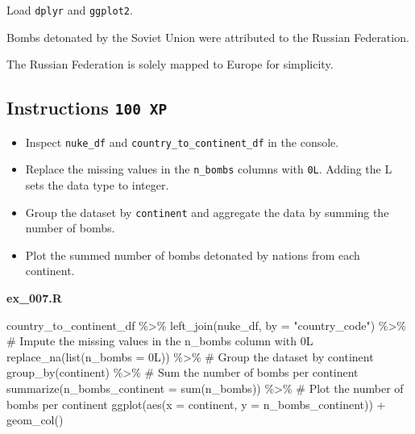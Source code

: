 \documentclass[
  letterpaper,
  DIV=11,
  numbers=noendperiod]{scrreprt}
\newenvironment{Shaded}{\begin{snugshade}}{\end{snugshade}}
\newcommand{\AttributeTok}[1]{\textcolor[rgb]{0.40,0.45,0.13}{#1}}
\newcommand{\CommentTok}[1]{\textcolor[rgb]{0.37,0.37,0.37}{#1}}
\newcommand{\FunctionTok}[1]{\textcolor[rgb]{0.28,0.35,0.67}{#1}}
\newcommand{\NormalTok}[1]{\textcolor[rgb]{0.00,0.23,0.31}{#1}}
\newcommand{\SpecialCharTok}[1]{\textcolor[rgb]{0.37,0.37,0.37}{#1}}
\newcommand{\StringTok}[1]{\textcolor[rgb]{0.13,0.47,0.30}{#1}}
\providecommand{\tightlist}{%
  \setlength{\itemsep}{0pt}\setlength{\parskip}{0pt}}\usepackage{longtable,booktabs,array}
\begin{document}
Load \texttt{dplyr} and \texttt{ggplot2}.

\begin{description}
\tightlist
\item[Side note 1:]
Bombs detonated by the Soviet Union were attributed to the Russian
Federation.
\item[Side note 2:]
The Russian Federation is solely mapped to Europe for simplicity.
\end{description}

\hypertarget{instructions-100-xp-6}{%
\subsection*{\texorpdfstring{Instructions
\texttt{100\ XP}}{Instructions 100 XP}}\label{instructions-100-xp-6}}

\begin{itemize}
\tightlist
\item
  Inspect \texttt{nuke\_df} and \texttt{country\_to\_continent\_df} in
  the console.
\item
  Replace the missing values in the \texttt{n\_bombs} columns with
  \texttt{0L}. Adding the L sets the data type to integer.
\item
  Group the dataset by \texttt{continent} and aggregate the data by
  summing the number of bombs.
\item
  Plot the summed number of bombs detonated by nations from each
  continent.
\end{itemize}

\textbf{ex\_007.R}

\begin{Shaded}
\begin{Highlighting}[]
\NormalTok{  country\_to\_continent\_df }\SpecialCharTok{\%\textgreater{}\%} 
  \FunctionTok{left\_join}\NormalTok{(nuke\_df, }\AttributeTok{by =} \StringTok{"country\_code"}\NormalTok{) }\SpecialCharTok{\%\textgreater{}\%}  
  \CommentTok{\# Impute the missing values in the n\_bombs column with 0L}
  \FunctionTok{replace\_na}\NormalTok{(}\FunctionTok{list}\NormalTok{(}\AttributeTok{n\_bombs =}\NormalTok{ 0L)) }\SpecialCharTok{\%\textgreater{}\%} 
  \CommentTok{\# Group the dataset by continent}
  \FunctionTok{group\_by}\NormalTok{(continent) }\SpecialCharTok{\%\textgreater{}\%} 
  \CommentTok{\# Sum the number of bombs per continent}
  \FunctionTok{summarize}\NormalTok{(}\AttributeTok{n\_bombs\_continent =} \FunctionTok{sum}\NormalTok{(n\_bombs)) }\SpecialCharTok{\%\textgreater{}\%} 
  \CommentTok{\# Plot the number of bombs per continent}
  \FunctionTok{ggplot}\NormalTok{(}\FunctionTok{aes}\NormalTok{(}\AttributeTok{x =}\NormalTok{ continent, }\AttributeTok{y =}\NormalTok{ n\_bombs\_continent)) }\SpecialCharTok{+}
  \FunctionTok{geom\_col}\NormalTok{()}
\end{Highlighting}
\end{Shaded}
\end{document}
